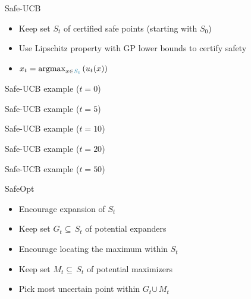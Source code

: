 \documentclass[xetex,10pt,mathserif,handout]{beamer}
\newlength\figureheight
\newlength\figurewidth
\newcommand{\localucb}{{\sc\textsf{Safe-UCB}}\xspace}
\newcommand{\cst}{{\color{cyan!70!black}$S_t$}\xspace}
\newcommand{\ccst}{{\color{cyan!70!black}S_t}\xspace}
\newcommand{\cgt}{{\color{lime!70!black}$G_t$}\xspace}
\newcommand{\cmt}{{\color{orange!70!black}$M_t$}\xspace}
\begin{document}
\begin{frame}{\localucb}
\begin{itemize}
  \item Keep set \cst of certified safe points (starting with $S_0$)
  \vspace{2em}
  \item Use Lipschitz property with GP lower bounds to certify safety
  \vspace{2em}
  \item $x_t = \argmax_{x \in \ccst} \left( u_t(x) \right)$
\end{itemize}
\end{frame}

\begin{frame}{\localucb example ($t = 0$)}
\centering
\setlength\figurewidth{5in}
\setlength\figureheight{3.5in}

\end{frame}

\begin{frame}{\localucb example ($t = 5$)}
\centering
\setlength\figurewidth{5in}
\setlength\figureheight{3.5in}

\end{frame}

\begin{frame}{\localucb example ($t = 10$)}
\centering
\setlength\figurewidth{5in}
\setlength\figureheight{3.5in}

\end{frame}

\begin{frame}{\localucb example ($t = 20$)}
\centering
\setlength\figurewidth{5in}
\setlength\figureheight{3.5in}

\end{frame}

\begin{frame}{\localucb example ($t = 50$)}
\centering
\setlength\figurewidth{5in}
\setlength\figureheight{3.5in}

\end{frame}

\begin{frame}{SafeOpt}
\begin{itemize}
  \item Encourage expansion of \cst
  \vspace{1em}
  \item Keep set \cgt$\subseteq\,$\cst of potential expanders
  \vspace{2em}
  \item Encourage locating the maximum within \cst
  \vspace{1em}
  \item Keep set \cmt$\subseteq\,$\cst of potential maximizers
  \vspace{2em}
  \item Pick most uncertain point within \cgt$\cup\,$\cmt
\end{itemize}
\end{frame}
\end{document}
